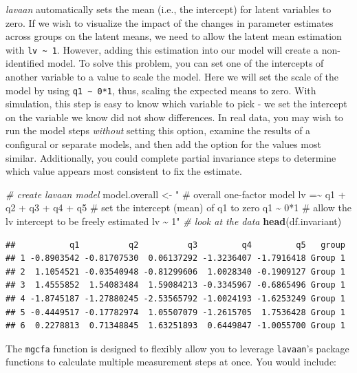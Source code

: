 \documentclass[
  man]{apa7}
\newenvironment{Shaded}{\begin{snugshade}}{\end{snugshade}}
\newcommand{\CommentTok}[1]{\textcolor[rgb]{0.56,0.35,0.01}{\textit{#1}}}
\newcommand{\FunctionTok}[1]{\textcolor[rgb]{0.13,0.29,0.53}{\textbf{#1}}}
\newcommand{\NormalTok}[1]{#1}
\newcommand{\OtherTok}[1]{\textcolor[rgb]{0.56,0.35,0.01}{#1}}
\newcommand{\StringTok}[1]{\textcolor[rgb]{0.31,0.60,0.02}{#1}}
\begin{document}
\emph{lavaan} automatically sets the mean (i.e., the intercept) for latent variables to zero. If we wish to visualize the impact of the changes in parameter estimates across groups on the latent means, we need to allow the latent mean estimation with \texttt{lv\ \textasciitilde{}\ 1}. However, adding this estimation into our model will create a non-identified model. To solve this problem, you can set one of the intercepts of another variable to a value to scale the model. Here we will set the scale of the model by using \texttt{q1\ \textasciitilde{}\ 0*1}, thus, scaling the expected means to zero. With simulation, this step is easy to know which variable to pick - we set the intercept on the variable we know did not show differences. In real data, you may wish to run the model steps \emph{without} setting this option, examine the results of a configural or separate models, and then add the option for the values most similar. Additionally, you could complete partial invariance steps to determine which value appears most consistent to fix the estimate.

\small

\begin{Shaded}
\begin{Highlighting}[]
\CommentTok{\# create lavaan model}
\NormalTok{model.overall }\OtherTok{\textless{}{-}} \StringTok{"}
\StringTok{\# overall one{-}factor model}
\StringTok{lv =\textasciitilde{} q1 + q2 + q3 + q4 + q5}
\StringTok{\# set the intercept (mean) of q1 to zero}
\StringTok{q1 \textasciitilde{} 0*1}
\StringTok{\# allow the lv intercept to be freely estimated}
\StringTok{lv \textasciitilde{} 1"}
\CommentTok{\# look at the data}
\FunctionTok{head}\NormalTok{(df.invariant)}
\end{Highlighting}
\end{Shaded}

\normalsize

\begin{verbatim}
##           q1          q2          q3         q4         q5   group
## 1 -0.8903542 -0.81707530  0.06137292 -1.3236407 -1.7916418 Group 1
## 2  1.1054521 -0.03540948 -0.81299606  1.0028340 -0.1909127 Group 1
## 3  1.4555852  1.54083484  1.59084213 -0.3345967 -0.6865496 Group 1
## 4 -1.8745187 -1.27880245 -2.53565792 -1.0024193 -1.6253249 Group 1
## 5 -0.4449517 -0.17782974  1.05507079 -1.2615705  1.7536428 Group 1
## 6  0.2278813  0.71348845  1.63251893  0.6449847 -1.0055700 Group 1
\end{verbatim}

The \texttt{mgcfa} function is designed to flexibly allow you to leverage \texttt{lavaan}'s package functions to calculate multiple measurement steps at once. You would include:
\end{document}
